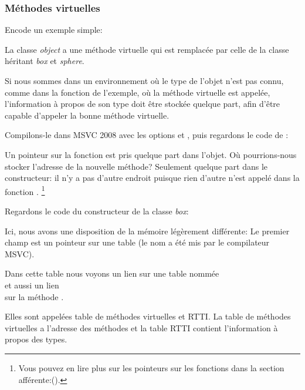 \subsubsection{Méthodes virtuelles}

Encode un exemple simple:




La classe \emph{object} a une méthode virtuelle  qui est remplacée par celle
de la classe héritant \emph{box} et \emph{sphere}.


Si nous sommes dans un environnement où le type de l'objet n'est pas connu, comme
dans la fonction \main de l'exemple, où la méthode virtuelle  est appelée,
l'information à propos de son type doit être stockée quelque part, afin d'être capable
d'appeler la bonne méthode virtuelle.


Compilons-le dans MSVC 2008 avec les options \Ox et \Obzero, puis regardons le code
de \main:




Un pointeur sur la fonction  est pris quelque part dans l'objet.
Où pourrions-nous stocker l'adresse de la nouvelle méthode?
Seulement quelque part dans le constructeur: il n'y a pas d'autre endroit puisque rien
d'autre n'est appelé dans la fonction \main.
\footnote{Vous pouvez en lire plus sur les pointeurs sur les fonctions dans la section afférente:().}


Regardons le code du constructeur de la classe \emph{box}:




Ici, nous avons une disposition de la mémoire légèrement différente:
Le premier champ est un pointeur sur une table  (le nom a été
mis par le compilateur MSVC).

\label{RTTI}

Dans cette table nous voyons un lien sur une table nommée \\
 et aussi un lien \\
sur la méthode .

Elles sont appelées table de méthodes virtuelles et \ac{RTTI}.
La table de méthodes virtuelles a l'adresse des méthodes et la table \ac{RTTI} contient
l'information à propos des types.

